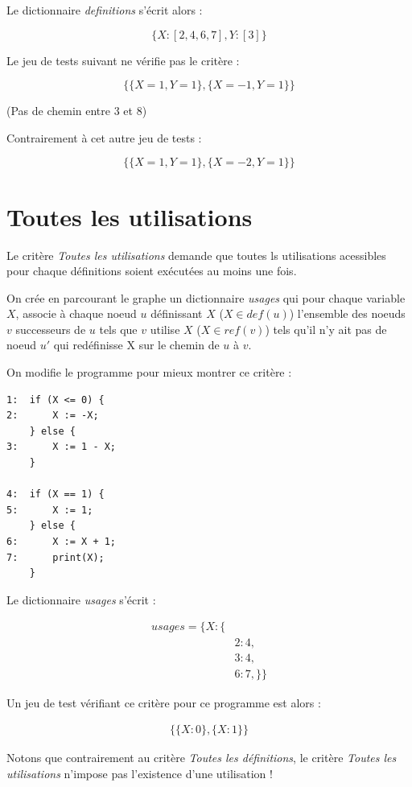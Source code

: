 Le dictionnaire \textit{definitions} s'écrit alors :

\[ \{
	X : [2, 4, 6, 7],
	Y : [3]
\} \]

Le jeu de tests suivant ne vérifie pas le critère :

\[ \{
	\{ X=1, Y=1\},
	\{ X=-1, Y=1 \}
\} \]

(Pas de chemin entre 3 et 8)


Contrairement à cet autre jeu de tests :

\[ \{
	\{ X=1, Y=1\},
	\{ X=-2, Y=1 \}
\} \]

\section{Toutes les utilisations}

Le critère \textit{Toutes les utilisations} demande que toutes ls utilisations acessibles pour chaque définitions soient exécutées au moins une fois.

On crée en parcourant le graphe un dictionnaire \textit{usages} qui pour chaque variable $X$, associe à chaque noeud $u$ définissant $X$ ($X \in def(u)$) l'ensemble des noeuds $v$ successeurs de $u$ tels que $v$ utilise $X$ ($X \in ref(v)$) tels qu'il n'y ait pas de noeud $u'$ qui redéfinisse X sur le chemin de $u$ à $v$.

On modifie le programme pour mieux montrer ce critère :
\begin{verbatim}
1:  if (X <= 0) {
2:      X := -X;
    } else {
3:      X := 1 - X;
    }

4:  if (X == 1) {
5:      X := 1;
    } else {
6:      X := X + 1;
7: 		print(X);
    }
\end{verbatim}

Le dictionnaire \textit{usages} s'écrit :

\begin{align*}
usages = \{
			X : \{ &\\
		&2 : 4, \\
		&3 : 4, \\
		&6 : 7,	\}\}
\end{align*}

Un jeu de test vérifiant ce critère pour ce programme est alors :

\begin{align*}
\{
	\{ X : 0 \},
	\{ X : 1 \}
\}
\end{align*}

Notons que contrairement au critère \textit{Toutes les définitions}, le critère \textit{Toutes les utilisations} n'impose pas l'existence d'une utilisation !


